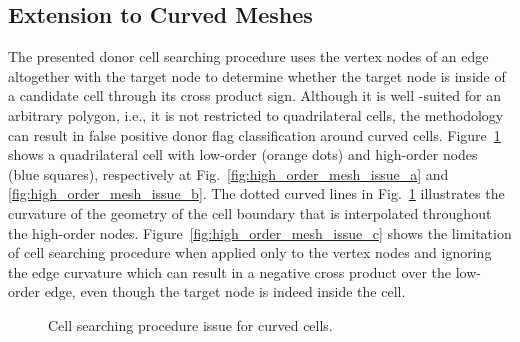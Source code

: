 \subsection{Extension to Curved Meshes}
The presented donor cell searching procedure uses the vertex nodes of an edge altogether with the target node to determine whether the target node is inside of a candidate cell through its cross product sign. Although it is well -suited for an arbitrary polygon, i.e., it is not restricted to quadrilateral cells, the methodology can result in false positive donor flag classification around curved cells. Figure\ \ref{fig:high_order_mesh_issue} shows a quadrilateral cell with low-order (orange dots) and high-order nodes (blue squares), respectively at Fig.\ \ref{fig:high_order_mesh_issue_a} and \ref{fig:high_order_mesh_issue_b}. The dotted curved lines in Fig.\ \ref{fig:high_order_mesh_issue} illustrates the curvature of the geometry of the cell boundary that is interpolated throughout the high-order nodes. Figure\ \ref{fig:high_order_mesh_issue_c} shows the limitation of cell searching procedure when applied only to the vertex nodes and ignoring the edge curvature which can result in a negative cross product over the low-order edge, even though the target node is indeed inside the cell.
%
\begin{figure}[H]
	\centering
    \caption{Cell searching procedure issue for curved cells.}
    \label{fig:high_order_mesh_issue}
\end{figure}

